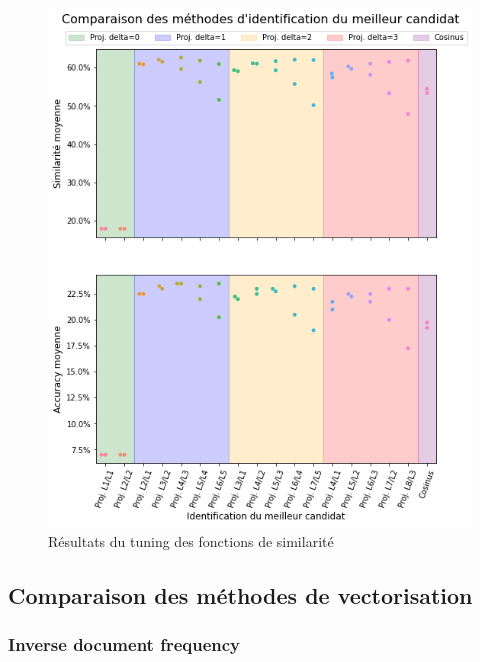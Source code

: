             \begin{figure}[htbp]
                \begin{center}
                \includegraphics[width=0.9\linewidth]{img/tuning_similarite.png}
                \end{center}
                \caption{Résultats du tuning des fonctions de similarité}
                \label{fig:tuning_similarite}
            \end{figure}

            \subsection{Comparaison des méthodes de vectorisation}

            \subsubsection{Inverse document frequency}

